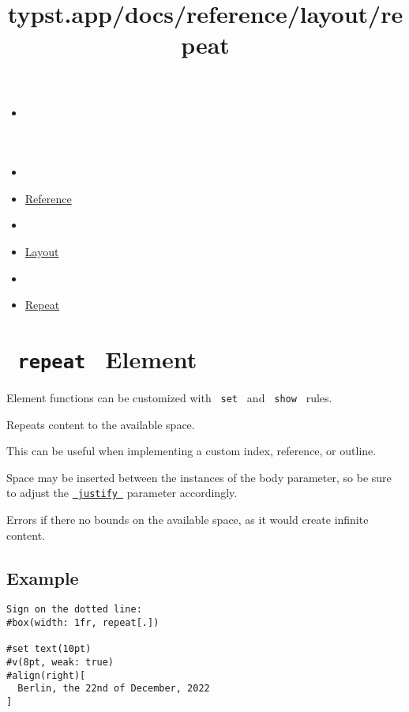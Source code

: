 \title{typst.app/docs/reference/layout/repeat}

\begin{itemize}
\tightlist
\item
  \href{/docs}{}
\item
  
\item
  \href{/docs/reference/}{Reference}
\item
  
\item
  \href{/docs/reference/layout/}{Layout}
\item
  
\item
  \href{/docs/reference/layout/repeat/}{Repeat}
\end{itemize}

\section{\texorpdfstring{\texttt{\ repeat\ } {{ Element
}}}{ repeat   Element }}\label{summary}

\label{element-tooltip}
Element functions can be customized with \texttt{\ set\ } and
\texttt{\ show\ } rules.

Repeats content to the available space.

This can be useful when implementing a custom index, reference, or
outline.

Space may be inserted between the instances of the body parameter, so be
sure to adjust the
\href{/docs/reference/layout/repeat/\#parameters-justify}{\texttt{\ justify\ }}
parameter accordingly.

Errors if there no bounds on the available space, as it would create
infinite content.

\subsection{Example}\label{example}

\begin{verbatim}
Sign on the dotted line:
#box(width: 1fr, repeat[.])

#set text(10pt)
#v(8pt, weak: true)
#align(right)[
  Berlin, the 22nd of December, 2022
]
\end{verbatim}

